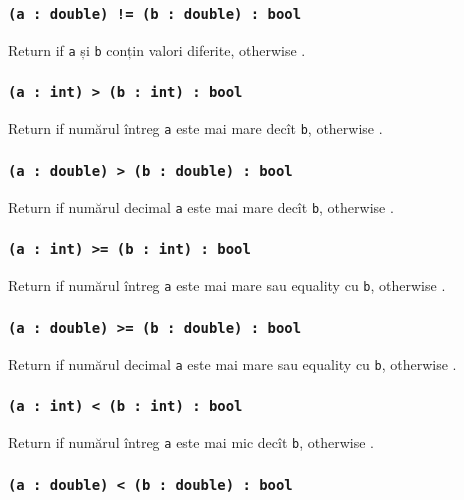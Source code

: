 \subsubsection{\texttt{(a : double) != (b : double) : bool}}

Return \true{} if \texttt{a} și \texttt{b} conțin valori diferite, otherwise \false{}.

\subsubsection{\texttt{(a : int) > (b : int) : bool}}

Return \true{} if numărul întreg \texttt{a} este mai mare decît \texttt{b}, otherwise \false{}.

\subsubsection{\texttt{(a : double) > (b : double) : bool}}

Return \true{} if numărul decimal \texttt{a} este mai mare decît \texttt{b}, otherwise \false{}.

\subsubsection{\texttt{(a : int) >= (b : int) : bool}}

Return \true{} if numărul întreg \texttt{a} este mai mare sau equality cu \texttt{b}, otherwise \false{}.

\subsubsection{\texttt{(a : double) >= (b : double) : bool}}

Return \true{} if numărul decimal \texttt{a} este mai mare sau equality cu \texttt{b}, otherwise \false{}.

\subsubsection{\texttt{(a : int) < (b : int) : bool}}

Return \true{} if numărul întreg \texttt{a} este mai mic decît \texttt{b}, otherwise \false{}.

\subsubsection{\texttt{(a : double) < (b : double) : bool}}

